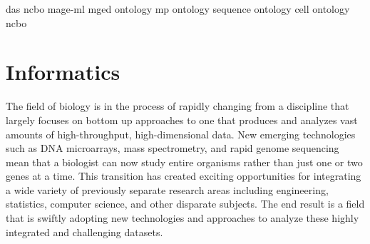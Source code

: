das			\cite{PMID_11667947}
ncbo			\cite{PMID_16901225}
mage-ml			\cite{PMID_12225585}
mged ontology		\cite{PMID_16428806}
mp ontology		\cite{PMID_15642099}
sequence ontology	\cite{PMID_15892872}
cell ontology		\cite{PMID_15693950}
ncbo			\cite{PMID_16901225}

\section{Informatics}
The field of biology is in the process of rapidly changing from a discipline
that largely focuses on bottom up approaches to one that produces and analyzes
vast amounts of high-throughput, high-dimensional data. New emerging
technologies such as DNA microarrays, mass spectrometry, and rapid genome
sequencing mean that a biologist can now study entire organisms rather than just
one or two genes at a time.  This transition has created exciting opportunities
for integrating a wide variety of previously separate research areas including
engineering, statistics, computer science, and other disparate subjects.  The
end result is a field that is swiftly adopting new technologies and approaches
to analyze these highly integrated and challenging datasets. 


